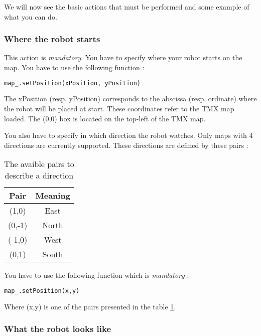 \documentclass[a4paper,11pt]{article}
\begin{document}
We will now see the basic actions that must be performed and some
example of what you can do.

\subsubsection{Where the robot starts}

This action is \emph{mandatory}. You have to specify where your robot
starts on the map. You have to use the following function :

\begin{lstlisting}[language=Python]
map_.setPosition(xPosition, yPosition)
\end{lstlisting}

The xPosition (resp. yPosition) corresponds to the abscissa
(resp. ordinate) where the robot will be placed at start. These
coordinates refer to the TMX map loaded. The (0,0) box is located on
the top-left of the TMX map.

You also have to specify in which direction the robot watches. Only
maps with 4 directions are currently supported. These directions are
defined by these pairs :


\begin{table}[h]
  \begin{center}
    \begin{tabular}{|c|c|}
      \hline
      Pair   & Meaning \\
      \hline
      (1,0)  & East    \\
      (0,-1) & North   \\
      (-1,0) & West    \\
      (0,1)  & South   \\
      \hline
    \end{tabular} 
    \caption{\label{tab:Pypairs} The avaible pairs to describe a
      direction}
  \end{center}
\end{table}


You have to use the following function which is \emph{mandatory} :

\begin{lstlisting}[language=Python]
map_.setPosition(x,y)
\end{lstlisting}

Where (x,y) is one of the pairs presented in the table \ref{tab:Pypairs}.

\subsubsection{What the robot looks like}
\end{document}

